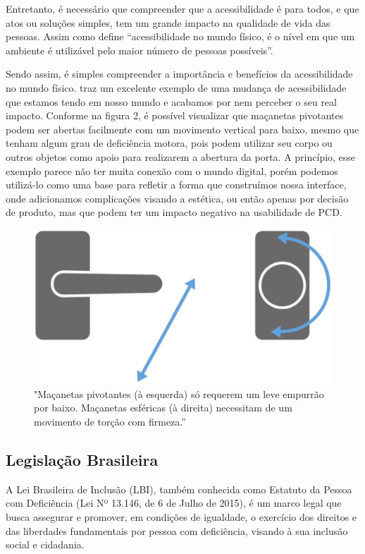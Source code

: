 Entretanto, é necessário que compreender que a acessibilidade é para todos, e que atos ou soluções simples, tem um grande impacto na qualidade de vida das pessoas. Assim como define \cite{kalbag2017} “acessibilidade no mundo físico, é o nível em que um ambiente é utilizável pelo maior número de pessoas possíveis”.

Sendo assim, é simples compreender a importância e benefícios da acessibilidade no mundo físico. \cite{kalbag2017} traz um excelente exemplo de uma mudança de acessibilidade que estamos tendo em nosso mundo e acabamos por nem perceber o seu real impacto. Conforme na figura 2, é possível visualizar que maçanetas pivotantes podem ser abertas facilmente com um movimento vertical para baixo, mesmo que tenham algum grau de deficiência motora, pois podem utilizar seu corpo ou outros objetos como apoio para realizarem a abertura da porta. A princípio, esse exemplo parece não ter muita conexão com o mundo digital, porém podemos utilizá-lo como uma base para refletir a forma que construímos nossa interface, onde adicionamos complicações visando a estética, ou então apenas por decisão de produto, mas que podem ter um impacto negativo na usabilidade de PCD.

\begin{figure}[!h]
	\centering
	\caption{"Maçanetas pivotantes (à esquerda) só requerem um leve empurrão por baixo. Maçanetas esféricas (à direita) necessitam de um movimento de torção com firmeza.”}
	\includegraphics[width=320pt]{Assets/Macanetas pivotantes.png}
\end{figure}

\subsection{Legislação Brasileira}

A Lei Brasileira de Inclusão (LBI), também conhecida como Estatuto da Pessoa com Deficiência (Lei Nº 13.146, de 6 de Julho de 2015), é um marco legal que busca assegurar e promover, em condições de igualdade, o exercício dos direitos e das liberdades fundamentais por pessoa com deficiência, visando à sua inclusão social e cidadania.

